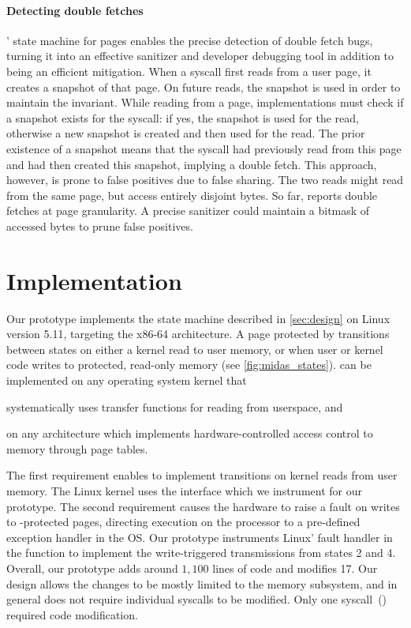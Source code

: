 \documentclass[letterpaper,twocolumn,10pt]{article}
\begin{document}
\paragraph{Detecting double fetches}
\midas' state machine for pages enables the precise detection of double fetch
bugs, turning it into an effective sanitizer and developer debugging tool in
addition to being an efficient mitigation.
When a syscall first reads from a user page, it creates a snapshot 
of that page.
On future reads, the snapshot is used in order to maintain the 
invariant.
While reading from a page, implementations must check 
if a snapshot exists for the syscall: if yes, the snapshot is used
for the read, otherwise a new snapshot is created and then used 
for the read. 
The prior existence of a snapshot means that the syscall had previously
read from this page and had then created this snapshot, implying a double 
fetch.
This approach, however, is prone to false positives due to false sharing.
The two reads might read from the same page, but access entirely 
disjoint bytes.
So far, \midas reports double fetches at page granularity. 
A precise sanitizer could maintain a bitmask of accessed bytes to
prune false positives.


\section{\midas Implementation}
\label{sec:impl}

Our \midas prototype implements the state machine described in 
\autoref{sec:design} on Linux version 5.11, targeting the x86-64 
architecture. 
A page protected by \midas transitions between states on 
either a kernel read to user memory, or when user or kernel code
writes to protected, read-only memory (see \autoref{fig:midas_states}).
\midas can be implemented on any operating system kernel that 
\begin{inparaenum}
\item systematically uses transfer functions for reading from userspace, and
\item on any architecture which implements hardware-controlled access 
control to memory through page tables.
\end{inparaenum}
The first requirement enables \midas to implement transitions on 
kernel reads from user memory.
The Linux kernel uses the  interface which 
we instrument for our prototype.
The second requirement causes the hardware to raise a fault on
writes to \midas-protected pages, 
directing execution on the processor to a pre-defined exception 
handler in the OS.
Our prototype instruments Linux' fault handler in the function 
 to implement the write-triggered transmissions 
from states 2 and 4.
Overall, our prototype adds around $1,100$ lines of code and modifies 
17. 
Our design allows the changes to be mostly limited to the memory 
subsystem, and in general does not require individual syscalls to
be modified.
Only one syscall~() required code modification.
\end{document}
